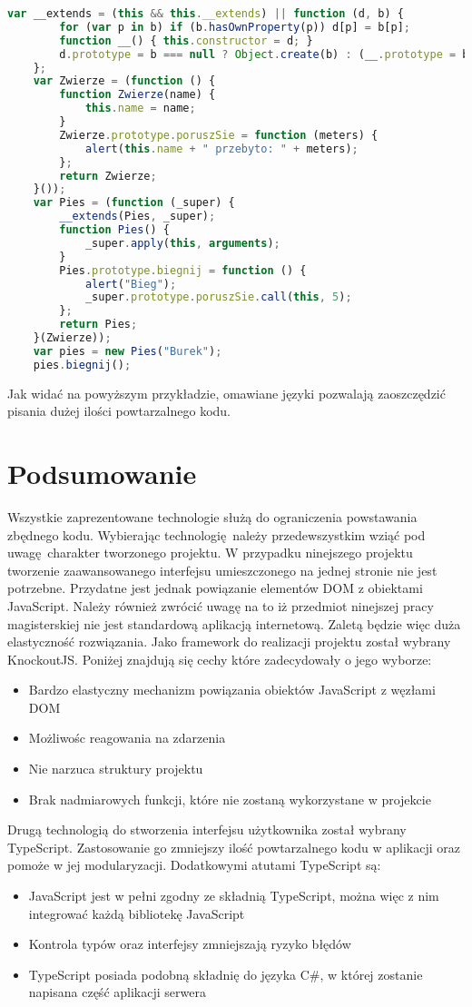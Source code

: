 \begin{lstlisting}[language=JavaScript,basicstyle=\small,frame=top,title={Kod JavaScript}]
	var __extends = (this && this.__extends) || function (d, b) {
	    for (var p in b) if (b.hasOwnProperty(p)) d[p] = b[p];
	    function __() { this.constructor = d; }
	    d.prototype = b === null ? Object.create(b) : (__.prototype = b.prototype, new __());
	};
	var Zwierze = (function () {
	    function Zwierze(name) {
	        this.name = name;
	    }
	    Zwierze.prototype.poruszSie = function (meters) {
	        alert(this.name + " przebyto: " + meters);
	    };
	    return Zwierze;
	}());
	var Pies = (function (_super) {
	    __extends(Pies, _super);
	    function Pies() {
	        _super.apply(this, arguments);
	    }
	    Pies.prototype.biegnij = function () {
	        alert("Bieg");
	        _super.prototype.poruszSie.call(this, 5);
	    };
	    return Pies;
	}(Zwierze));
	var pies = new Pies("Burek");
	pies.biegnij();
\end{lstlisting} 	

Jak widać na powyższym przykładzie, omawiane języki pozwalają zaoszczędzić pisania dużej ilości powtarzalnego kodu.


\section{Podsumowanie}
Wszystkie zaprezentowane technologie służą do ograniczenia powstawania zbędnego kodu. Wybierając technologię należy przedewszystkim wziąć pod uwagę charakter tworzonego projektu. W przypadku ninejszego projektu tworzenie zaawansowanego interfejsu umieszczonego na jednej stronie nie jest potrzebne. Przydatne jest jednak powiązanie elementów DOM z obiektami JavaScript. Należy również zwrócić uwagę na to iż przedmiot ninejszej pracy magisterskiej nie jest standardową aplikacją internetową. Zaletą będzie więc duża elastyczność rozwiązania. Jako framework do realizacji projektu został wybrany KnockoutJS. Poniżej znajdują się cechy które zadecydowały o jego wyborze:
\begin{itemize}
\item Bardzo elastyczny mechanizm powiązania obiektów JavaScript z węzłami DOM
\item Możliwośc reagowania na zdarzenia
\item Nie narzuca struktury projektu
\item Brak nadmiarowych funkcji, które nie zostaną wykorzystane w projekcie
\end{itemize}

Drugą technologią do stworzenia interfejsu użytkownika został wybrany TypeScript. Zastosowanie go zmniejszy ilość powtarzalnego kodu w aplikacji oraz pomoże w jej modularyzacji. Dodatkowymi atutami TypeScript są:
\begin{itemize}
\item JavaScript jest w pełni zgodny ze składnią TypeScript, można więc z nim integrować każdą bibliotekę JavaScript
\item Kontrola typów oraz interfejsy zmniejszają ryzyko błędów
\item TypeScript posiada podobną składnię do języka C\#, w której zostanie napisana część aplikacji serwera
\end{itemize}

